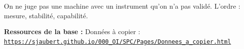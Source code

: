 \documentclass[10pt,a4paper]{article}
\begin{document}
\begin{tcolorbox}[retenir]On ne juge pas une machine avec un instrument qu'on n'a pas validé. L'ordre : mesure, stabilité, capabilité.\end{tcolorbox}
\vfill{\footnotesize\color{uimm}\textbf{Ressources de la base :} Données à copier : \href{https://sjaubert.github.io/000_OI/SPC/Pages/Donnees_a_copier.html\#s5just}{\nolinkurl{https://sjaubert.github.io/000_OI/SPC/Pages/Donnees_a_copier.html}}}
\end{document}
